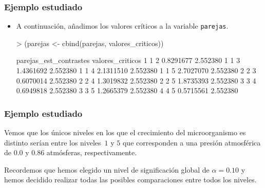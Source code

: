 \begin{frame}[fragile]
\frametitle{Ejemplo estudiado}
\begin{itemize}
\item<2-> A continuación, añadimos los valores críticos a la variable {\tt parejas}.

{\small
\begin{Schunk}
\begin{Sinput}
> (parejas <- cbind(parejas, valores_criticos))
\end{Sinput}
\begin{Soutput}
      parejas_est_contrastes valores_criticos
1 1 2              0.8291677         2.552380
1 1 3              1.4361692         2.552380
1 1 4              2.1311510         2.552380
1 1 5              2.7027070         2.552380
2 2 3              0.6070014         2.552380
2 2 4              1.3019832         2.552380
2 2 5              1.8735393         2.552380
3 3 4              0.6949818         2.552380
3 3 5              1.2665379         2.552380
4 4 5              0.5715561         2.552380
\end{Soutput}
\end{Schunk}
}

\end{itemize}
\end{frame}
\begin{frame}
\frametitle{Ejemplo estudiado}
Vemos que los únicos niveles en los que el crecimiento del microorganismo es distinto serían entre los niveles~$1$ y $5$ que corresponden a una presión atmosférica de $0.0$ y $0.86$ atmósferas, respectivamente. 

Recordemos que hemos elegido un nivel de significación global de $\alpha =0.10$ y hemos decidido realizar todas las posibles comparaciones entre
todos los niveles.
\end{frame}

\iffalse

